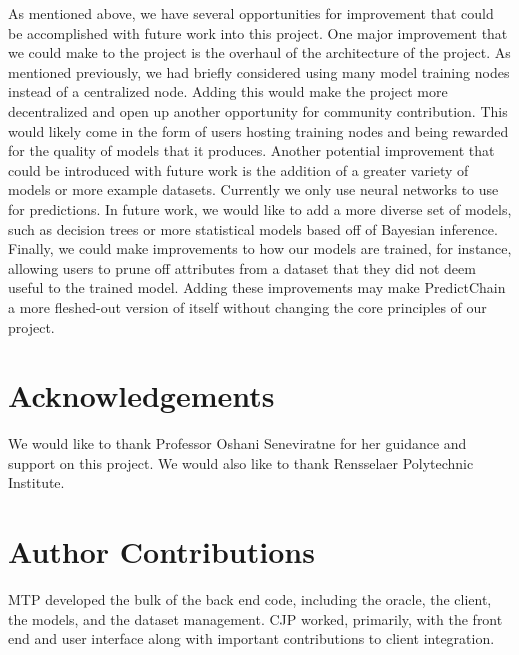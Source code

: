 \documentclass{ledger}
\begin{document}
As mentioned above, we have several opportunities for improvement that could be accomplished with future work
into this project.  One major improvement that we could make to the project is the overhaul of the architecture of
the project.  As mentioned previously, we had briefly considered using many model training nodes instead of a
centralized node.  Adding this would make the project more decentralized and open up another opportunity
for community contribution.  This would likely come in the form of users hosting training nodes and being rewarded for
the quality of models that it produces.  Another potential improvement that could be introduced with future work is
the addition of a greater variety of models or more example datasets.  Currently we only use neural networks to
use for predictions.  In future work, we would like to add a more diverse set of models, such as decision trees or
more statistical models based off of Bayesian inference.  Finally, we could make improvements to how our models are
trained, for instance, allowing users to prune off attributes from a dataset that they did not deem useful to the
trained model.  Adding these improvements may make PredictChain a more fleshed-out version of itself without changing
the core principles of our project.

\ledgernotes

\section*{Acknowledgements} 

We would like to thank Professor Oshani Seneviratne for her guidance and support on this project.
We would also like to thank Rensselaer Polytechnic Institute.

\section*{Author Contributions}

MTP developed the bulk of the back end code, including the oracle, the client, the models, and the dataset management.
CJP worked, primarily, with the front end and user interface along with important contributions to client integration.



\end{document}
